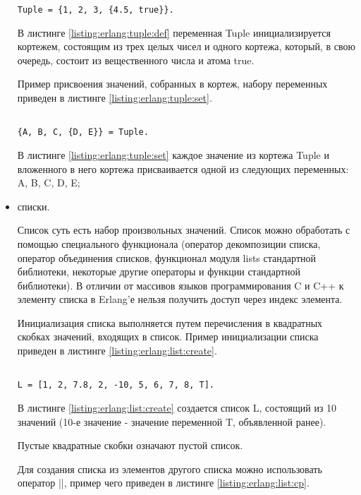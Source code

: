 \begin{itemize}
\begin{lstlisting}
Tuple = {1, 2, 3, {4.5, true}}.

\end{lstlisting}
\mylistingend

		В листинге \ref{listing:erlang:tuple:def} переменная Tuple инициализируется кортежем, состоящим из трех целых чисел и одного кортежа, который, в свою очередь, состоит из вещественного числа и атома true.

		Пример присвоения значений, собранных в кортеж, набору переменных приведен в листинге \ref{listing:erlang:tuple:set}.

\begin{lstlisting}

{A, B, C, {D, E}} = Tuple.

\end{lstlisting}
\mylistingend

		В листинге \ref{listing:erlang:tuple:set} каждое значение из кортежа Tuple и вложенного в него кортежа присваивается одной из следующих переменных: A, B, C, D, E;

	\item списки.

		Список суть есть набор произвольных значений. Список можно обработать с помощью специального функционала (оператор декомпозиции списка, оператор объединения списков, функционал модуля lists стандартной библиотеки, некоторые другие операторы и функции стандартной библиотеки). В отличии от массивов языков программирования C и C++ к элементу списка в Erlang'е нельзя получить доступ через индекс элемента.

		Инициализация списка выполняется путем перечисления в квадратных скобках значений, входящих в список. Пример инициализации списка приведен в листинге \ref{listing:erlang:list:create}.

\begin{lstlisting}

L = [1, 2, 7.8, 2, -10, 5, 6, 7, 8, T].

\end{lstlisting}
\mylistingend

		В листинге \ref{listing:erlang:list:create} создается список L, состоящий из 10 значений (10-е значение - значение переменной T, объявленной ранее).

		Пустые квадратные скобки означают пустой список.

		Для создания списка из элементов другого списка можно использовать оператор ||, пример чего приведен в листинге \ref{listing:erlang:list:cp}.


\end{itemize}
